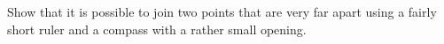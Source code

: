 Show that it is possible to join two points that are very far apart using a fairly short ruler and a compass with a rather small opening.
